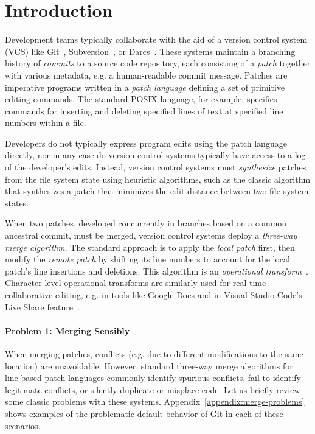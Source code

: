 
\section{Introduction}%
\label{sec:Introduction}

Development teams typically collaborate with the aid of a version control system (VCS) like Git~\cite{git}, Subversion~\cite{subversion}, or Darcs~\cite{darcs}. 
These systems maintain a branching history of \emph{commits} to a source code repository, each consisting of a \emph{patch} together with various metadata, e.g. a human-readable commit message. Patches are imperative programs written in a 
\emph{patch language} defining a set of primitive editing commands.
The standard POSIX  language, for example, specifies commands for inserting and deleting specified lines of text at specified line numbers within a file. 

Developers do not typically express program edits using the patch language directly, nor in any case do version control systems typically have access to a log of the developer's edits. Instead, version control systems must \emph{synthesize} patches from the file system state using heuristic algorithms, such as the classic  algorithm that synthesizes a patch that minimizes the edit distance between two file system states.

When two patches, developed concurrently in branches based on a common ancestral commit, must be merged, version control systems deploy a \emph{three-way merge algorithm}. The standard approach is to apply the \emph{local patch} first, then modify the \emph{remote patch} by shifting its line numbers to account for the local patch's line insertions and deletions. This algorithm is an \emph{operational transform}~\cite{ot}. 
Character-level operational transforms are similarly used for real-time collaborative editing, e.g. in tools like Google Docs and in Visual Studio Code's Live Share feature~\cite{crdts-for-text}. 

\paragraph{Problem 1: Merging Sensibly} 
When merging patches, conflicts (e.g. due to different modifications to the same location) are unavoidable. However, 
standard three-way merge algorithms for line-based patch languages commonly identify spurious conflicts, fail to identify legitimate conflicts, or silently duplicate or misplace code. Let us briefly review some classic problems with these systems. Appendix~\ref{appendix:merge-problems} shows examples of the problematic default behavior of Git in each of these scenarios.

